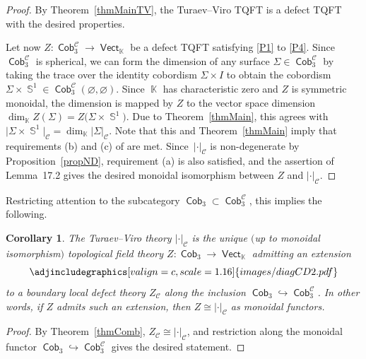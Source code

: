 \documentclass[10pt,a4paper]{amsart}
\DeclareMathOperator{\vect}{\mathsf{Vect}}
\DeclareMathOperator{\K}{\mathbb{K}}
\DeclareMathOperator{\Sp}{\mathbb{S}}
\DeclareMathOperator{\Cob}{\mathsf{Cob}}
\DeclareMathOperator{\calc}{\mathcal{C}}
\numberwithin{equation}{section}
\newtheorem{Corollary}[Corollary]{Corollary}
\theoremstyle{definition}
\begin{document}
\begin{proof}By Theorem~\ref{thmMainTV}, the Turaev--Viro TQFT is a defect TQFT with the desired properties.

Let now $Z\colon \Cob_3^{\calc} \rightarrow \vect_{\K}$ be a defect TQFT satisfying \ref{P1} to \ref{P4}. Since $\Cob_3^{\calc}$ is spherical, we can form the dimension of any surface $\Sigma \in \Cob_3^{\calc}$ by taking the trace over the identity cobordism $\Sigma \times I$ to obtain the cobordism $\Sigma \times \Sp^1 \in \Cob_3^{\calc}(\varnothing, \varnothing)$. Since $\K$ has characteristic zero and $Z$ is symmetric monoidal, the dimension is mapped by $Z$ to the vector space dimension $\dim_{\K}Z(\Sigma) = Z\bigl(\Sigma \times \Sp^1\bigr)$. Due to Theorem~\ref{thmMain}, this agrees with $\bigl|\Sigma \times \Sp^1\bigr|_{\calc} = \dim_{\K}|\Sigma|_{\calc}$. Note that this and Theorem~\ref{thmMain} imply that requirements (b) and (c) of \cite[Lemma~17.2]{TV} are met. Since~$| \cdot |_{\calc}$ is non-degenerate by Proposition~\ref{propND}, requirement (a) is also satisfied, and the assertion of Lemma~17.2 gives the desired monoidal isomorphism between $Z$ and $| \cdot |_{\calc}$.
\end{proof}


Restricting attention to the subcategory $\Cob_3 \subset \Cob_3^{\calc}$, this implies the following.
\begin{Corollary}
 \label{corThmMain2}
 The Turaev--Viro theory $|\cdot|_{\calc}$ is the unique $($up to monoidal isomorphism$)$ topological field theory $Z\colon \Cob_3 \rightarrow \vect_{\K}$ admitting an extension
 \[
 \centering
 \adjincludegraphics[valign=c, scale = 1.16]{images/diagCD2.pdf}
 \]
 to a boundary local defect theory $Z_{\calc}$ along the inclusion $\Cob_3 \hookrightarrow \Cob_3^{\calc}$. In other words, if $Z$ admits such an extension, then $Z \cong |\cdot|_{\calc}$ as monoidal functors.
\end{Corollary}
\begin{proof}
By Theorem~\ref{thmComb}, $Z_{\calc} \cong | \cdot |_{\calc}$, and restriction along the monoidal functor $\Cob_3 \hookrightarrow \Cob_3^{\calc}$ gives the desired statement.
\end{proof}
\end{document}
